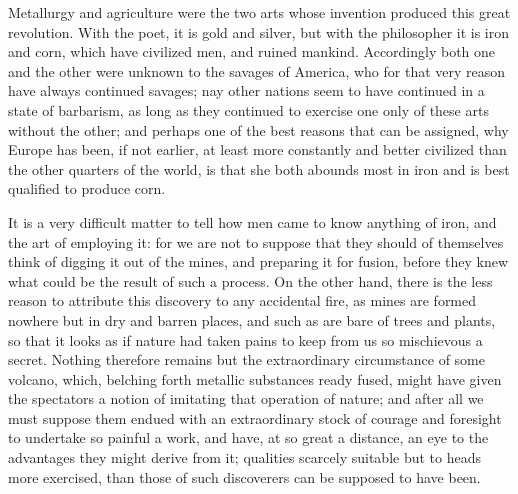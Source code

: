 \documentclass[11pt,twocolumn]{ltugboat}
\begin{document}
Metallurgy and agriculture were the two arts whose invention produced
this great revolution. With the poet, it is gold and silver, but with
the philosopher it is iron and corn, which have civilized men, and
ruined mankind. Accordingly both one and the other were unknown to the
savages of America, who for that very reason have always continued
savages; nay other nations seem to have continued in a state of
barbarism, as long as they continued to exercise one only of these
arts without the other; and perhaps one of the best reasons that can
be assigned, why Europe has been, if not earlier, at least more
constantly and better civilized than the other quarters of the world,
is that she both abounds most in iron and is best qualified to
produce corn.

It is a very difficult matter to tell how men came to know anything of
iron, and the art of employing it: for we are not to suppose that they
should of themselves think of digging it out of the mines, and
preparing it for fusion, before they knew what could be the result of
such a process. On the other hand, there is the less reason to
attribute this discovery to any accidental fire, as mines are formed
nowhere but in dry and barren places, and such as are bare of trees
and plants, so that it looks as if nature had taken pains to keep from
us so mischievous a secret. Nothing therefore remains but the
extraordinary circumstance of some volcano, which, belching forth
metallic substances ready fused, might have given the spectators a
notion of imitating that operation of nature; and after all we must
suppose them endued with an extraordinary stock of courage and
foresight to undertake so painful a work, and have, at so great a
distance, an eye to the advantages they might derive from it;
qualities scarcely suitable but to heads more exercised, than those of
such discoverers can be supposed to have been.
\end{document}
